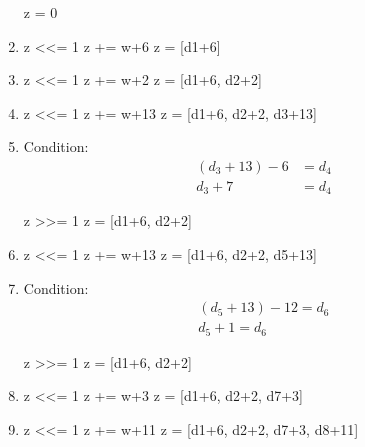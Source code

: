 \documentclass{article}
\begin{document}
\begin{enumerate}
\begin{snippet}[py]
z = 0
\end{snippet}

\item{}
\begin{snippet}[py]
z <<= 1
z += w+6
z = [d1+6]
\end{snippet}

\item{}
\begin{snippet}[py]
z <<= 1
z += w+2
z = [d1+6, d2+2]
\end{snippet}

\item{}
\begin{snippet}[py]
z <<= 1
z += w+13
z = [d1+6, d2+2, d3+13]
\end{snippet}

\item{}

Condition: 
\begin{align*}
(d_3 + 13) - 6 &= d_4 \\
d_3 + 7 &= d_4
\end{align*}
\begin{snippet}[py]
z >>= 1
z = [d1+6, d2+2]
\end{snippet}

\item{}
\begin{snippet}[py]
z <<= 1
z += w+13
z = [d1+6, d2+2, d5+13]
\end{snippet}

\item{}

Condition: 
\begin{align*}
(d_5 + 13) - 12 = d_6 \\
d_5 + 1 = d_6
\end{align*}
\begin{snippet}[py]
z >>= 1
z = [d1+6, d2+2]
\end{snippet}

\item{}
\begin{snippet}[py]
z <<= 1
z += w+3
z = [d1+6, d2+2, d7+3]
\end{snippet}

\item{}
\begin{snippet}[py]
z <<= 1
z += w+11
z = [d1+6, d2+2, d7+3, d8+11]
\end{snippet}


\end{enumerate}
\end{document}
